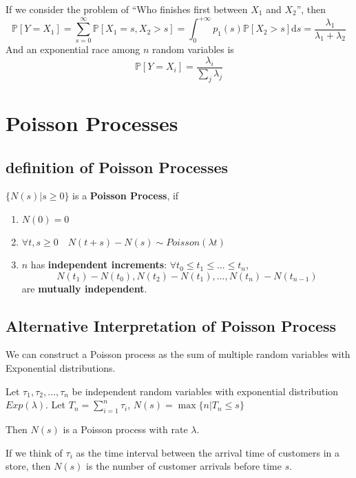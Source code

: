         If we consider the problem of ``Who finishes first between $X_1$ and $X_2$'', then
        \[ \mathbb{P}[Y=X_1]=\sum_{s=0}^\infty \mathbb{P}[X_1=s,X_2>s] = \int_0^{+\infty}p_1(s)\mathbb{P}[X_2>s]\mathrm{d}s = \frac{\lambda_1}{\lambda_1 + \lambda_2} \]
        And an exponential race among $n$ random variables is
        \[ \mathbb{P}[Y=X_i] = \frac{\lambda_i}{\sum_j \lambda_j} \]


\section{Poisson Processes}

    \subsection{definition of Poisson Processes}
    \begin{definition}\label{def:PoissonProcess}
        $\{N(s)|s \ge 0\}$ is a \textbf{Poisson Process}, if
        \begin{enumerate}
            \item $N(0)=0$
            \item $\forall t, s \ge 0 \quad N(t+s) - N(s) \sim Poisson(\lambda t)$
            \item $n$ has \textbf{independent increments}: $\forall t_0 \le t_1 \le \dots \le t_n$,
            \[ N(t_1)-N(t_0), N(t_2)-N(t_1), \dots, N(t_n)-N(t_{n-1}) \]
            are \textbf{mutually independent}.
        \end{enumerate}
    \end{definition}

    \subsection{Alternative Interpretation of Poisson Process}
    We can construct a Poisson process as the sum of multiple random variables with Exponential distributions.
    \begin{proposition}\label{prop:AltdefOfPoissonProcess}
        Let $\tau_1,\tau_2,\dots,\tau_n$ be independent random variables with exponential distribution $Exp(\lambda)$. Let $T_n=\sum_{i=1}^n\tau_i$, $N(s)=\max\{n|T_n \le s\}$

        Then $N(s)$ is a Poisson process with rate $\lambda$.
    \end{proposition}
    \begin{remark}
        If we think of $\tau_i$ as the time interval between the arrival time of customers in a store, then $N(s)$ is the number of customer arrivals before time $s$.
    \end{remark}

